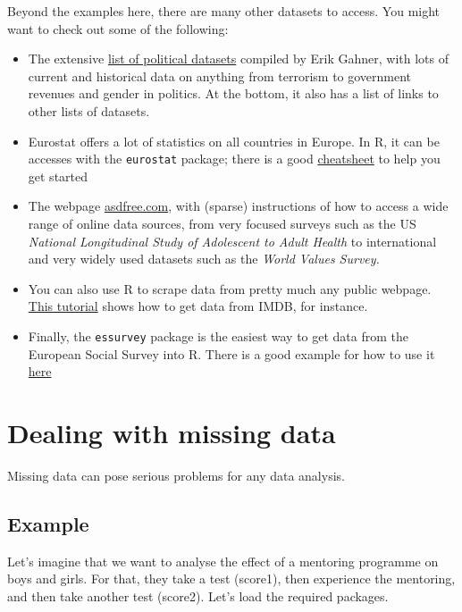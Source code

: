 \documentclass[
]{book}
\providecommand{\tightlist}{%
  \setlength{\itemsep}{0pt}\setlength{\parskip}{0pt}}
\begin{document}
Beyond the examples here, there are many other datasets to access. You might want to check out some of the following:

\begin{itemize}
\tightlist
\item
  The extensive \href{https://github.com/erikgahner/PolData}{list of political datasets} compiled by Erik Gahner, with lots of current and historical data on anything from terrorism to government revenues and gender in politics. At the bottom, it also has a list of links to other lists of datasets.
\item
  Eurostat offers a lot of statistics on all countries in Europe. In R, it can be accesses with the \texttt{eurostat} package; there is a good \href{https://github.com/rstudio/cheatsheets/raw/master/eurostat.pdf}{cheatsheet} to help you get started
\item
  The webpage \href{http://asdfree.com/}{asdfree.com}, with (sparse) instructions of how to access a wide range of online data sources, from very focused surveys such as the US \emph{National Longitudinal Study of Adolescent to Adult Health} to international and very widely used datasets such as the \emph{World Values Survey.}
\item
  You can also use R to scrape data from pretty much any public webpage. \href{https://www.analyticsvidhya.com/blog/2017/03/beginners-guide-on-web-scraping-in-r-using-rvest-with-hands-on-knowledge/}{This tutorial} shows how to get data from IMDB, for instance.
\item
  Finally, the \texttt{essurvey} package is the easiest way to get data from the European Social Survey into R. There is a good example for how to use it \href{https://ropensci.org/blog/2018/06/14/essurvey/}{here}
\end{itemize}

\hypertarget{dealing-with-missing-data}{%
\chapter{Dealing with missing data}\label{dealing-with-missing-data}}

Missing data can pose serious problems for any data analysis.

\hypertarget{example}{%
\section{Example}\label{example}}

Let's imagine that we want to analyse the effect of a mentoring programme on boys and girls. For that, they take a test (score1), then experience the mentoring, and then take another test (score2). Let's load the required packages.
\end{document}
